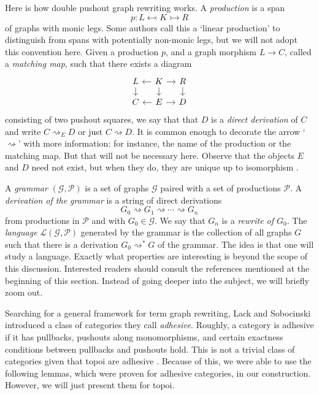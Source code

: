 \documentclass[11pt]{amsart}
\theoremstyle{remark}
\theoremstyle{definition}
\begin{document}
Here is how double pushout graph rewriting works. A \emph{production} is a span 
\[
p: L \leftarrowtail K \rightarrowtail R
\] 
of graphs with monic legs. Some authors call this a `linear production' to distinguish from spans with potentially non-monic legs, but we will not adopt this convention here. Given a production $p$, and a graph morphism $L \to C$, called a \emph{matching map}, such that there exists a diagram
%
\begin{equation}
	\label{diag:derivation}
	\begin{tikzcd}[column sep=1em,row sep=1em]
		{L} 
		\ar[d]  &
		{K} 
		\ar[l] 
		\ar[d]
		\ar[r] &
		{R} 
		\ar[d] \\
		{C} &
		{E} 
		\ar[r]
		\ar[l] &
		{D}
	\end{tikzcd}
\end{equation}
%
consisting of two pushout squares, we say that that $D$ is a \emph{direct derivation} of $C$ and write $C \rightsquigarrow_E D$ or just $C \rightsquigarrow D$. It is common enough to decorate the arrow `$\rightsquigarrow$' with more information: for instance, the name of the production or the matching map.  But that will not be necessary here. Observe that the objects $E$ and $D$ need not exist, but when they do, they are unique up to isomorphism \cite[Lemma 4.5]{LackSoboc_AdhesiveCategories}. 

A \emph{grammar} $(\mathcal{G},\mathcal{P})$ is a set of graphs $\mathcal{G}$ paired with a 
set of productions $\mathcal{P}$. A \textit{derivation of the grammar} is a string of direct derivations 
\[
	G_0 \rightsquigarrow G_1 \rightsquigarrow \dotsm \rightsquigarrow G_n
\] 
from productions in $\mathcal{P}$ and with $G_0 \in \mathcal{G}$. We say that $G_n$ is a \emph{rewrite of $G_0$}. The \textit{language} $\mathcal{L}(\mathcal{G},\mathcal{P})$ generated by the grammar is the collection of all graphs $G$ such that there is a derivation $G_0 \rightsquigarrow^\ast G$ of the grammar. The idea is that one will study a language. Exactly what properties are interesting is beyond the scope of this discussion.  Interested readers should consult the references mentioned at the beginning of this section.  Instead of going deeper into the subject, we will briefly zoom out.
%
%
%
%
%
%

Searching for a general framework for term graph rewriting, Lack and Sobocinski \cite{LackSoboc_AdhesiveCategories} introduced a class of categories they call \emph{adhesive}. Roughly, a category is adhesive if it has pullbacks, pushouts along monomorphisms, and certain exactness conditions between pullbacks and pushouts hold. This is not a trivial class of categories given that topoi are adhesive \cite{LackSoboc_ToposesAdhesive}. Because of this, we were able to use the following lemmas, which were proven for adhesive categories, in our construction. However, we will just present them for topoi.                                 
%
%
%
%
%
%
\end{document}
